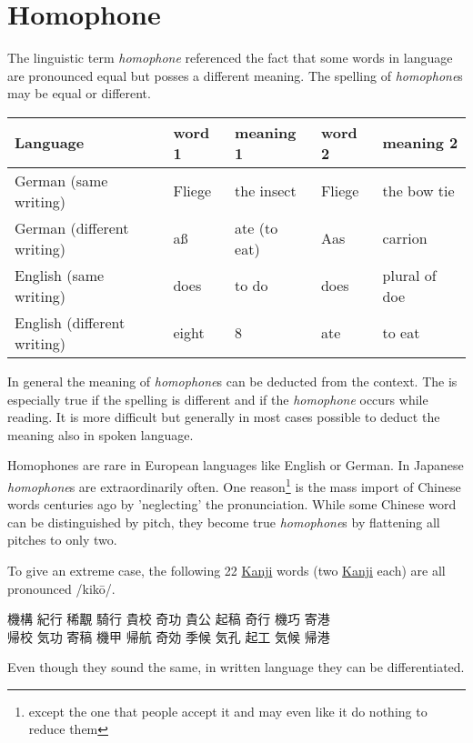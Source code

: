 \section{Homophone} 
\label{sec:Homophone}

The linguistic term \textit{homophone} referenced the fact that some words in
language are pronounced equal but posses a different meaning. The spelling of
\textit{homophone}s may be equal or different.

\begin{center}\begin{tabular}{lllll}
\textbf{Language}&\textbf{word 1}&\textbf{meaning 1}&\textbf{word 2}&\textbf{meaning 2}\\\hline
German (same writing)      &Fliege&the insect  &Fliege &the bow tie \\
German (different writing) &aß    &ate (to eat)&Aas    &carrion     \\
English (same writing)     &does  &to do       &does   &plural of doe\\
English (different writing)&eight &8           &ate    &to eat       \\
\end{tabular}\end{center}

In general the meaning of \textit{homophone}s can be deducted from the context.
The is especially true if the spelling is different and if the
\textit{homophone} occurs while reading. It is more difficult but generally in
most cases possible to deduct the meaning also in spoken language. 

Homophones are rare in European languages like English or German. In Japanese
\textit{homophone}s are extraordinarily often. One reason\footnote{except the
one that people accept it and may even like it do nothing to reduce them} is
the mass import of Chinese words centuries ago by 'neglecting' the
pronunciation. While some Chinese word can be distinguished by pitch, they
become true \textit{homophone}s by flattening all pitches to only two. 

To give an extreme case, the following 22 \hyperref[sec:Kanji]{Kanji} words
(two \hyperref[sec:Kanji]{Kanji} each) are all pronounced /kikō/.

\begin{center}
{機構} {紀行} {稀覯} {騎行} {貴校} {奇功} {貴公} {起稿} {奇行} {機巧} {寄港}\\
{帰校} {気功} {寄稿} {機甲} {帰航} {奇効} {季候} {気孔} {起工} {気候} {帰港}
\end{center}

Even though they sound the same, in written language they can be differentiated. 


